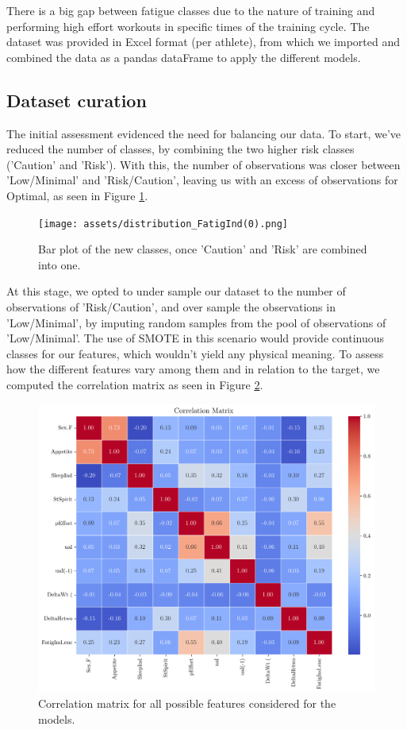 \documentclass[conference]{IEEEtran}
\begin{document}
There is a big gap between fatigue classes due to the nature of training and performing high effort workouts in specific times of the training cycle. The dataset was provided in Excel format (per athlete), from which we imported and combined the data as a pandas dataFrame to apply the different models.



\subsection{Dataset curation}

The initial assessment evidenced the need for balancing our data. To start, we've reduced the number of classes, by combining the two higher risk classes ('Caution' and 'Risk'). With this, the number of observations was closer between 'Low/Minimal' and 'Risk/Caution', leaving us with an excess of observations for Optimal, as seen in Figure \ref{histClasses}. 

\begin{figure}[H]
    \centering
    \texttt{[image: assets/distribution\_FatigInd(0).png]}
    \caption{Bar plot of the new classes, once 'Caution' and 'Risk' are combined into one.}
    \label{histClasses}
\end{figure}

At this stage, we opted to under sample our dataset to the number of observations of 'Risk/Caution', and over sample the observations in 'Low/Minimal', by imputing random samples from the pool of observations of 'Low/Minimal'. The use of SMOTE in this scenario would provide continuous classes for our features, which wouldn't yield any physical meaning.
To assess how the different features vary among them and in relation to the target, we computed the correlation matrix as seen in Figure \ref{fig:correlationMatrix}.

\begin{figure}[H]
    \centering
    \includegraphics[width=1\linewidth]{assets/correlation_matrix.png}
    \caption{Correlation matrix for all possible features considered for the models.}
    \label{fig:correlationMatrix}
\end{figure}
\end{document}
